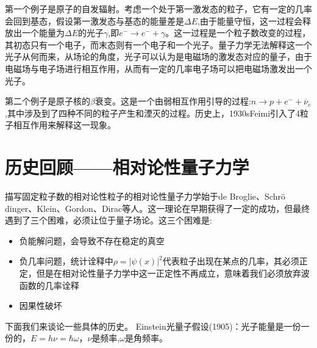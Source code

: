 第一个例子是原子的自发辐射。考虑一个处于第一激发态的粒子，它有一定的几率会回到基态，假设第一激发态与基态的能量差是$\Delta E$,由于能量守恒，这一过程会释放出一个能量为$\Delta E$的光子$\gamma$,即$e^{-} \longrightarrow e^{-}+\gamma$。这一过程是一个粒子数改变的过程，其初态只有一个电子，而末态则有一个电子和一个光子。量子力学无法解释这一个光子从何而来，从场论的角度，光子可以认为是电磁场的激发态对应的量子，由于电磁场与电子场进行相互作用，从而有一定的几率电子场可以把电磁场激发出一个光子。

第二个例子是原子核的$\beta$衰变。这是一个由弱相互作用引导的过程:$n \longrightarrow p+e^{-}+\overline{\nu}_{e}$,其中涉及到了四种不同的粒子产生和湮灭的过程。历史上，1930sFeimi引入了4粒子相互作用来解释这一现象。
\section{历史回顾——相对论性量子力学}
描写固定粒子数的相对论性粒子的相对论性量子力学始于de Broglie、Schr$\ddot{\rm{o}}$dinger、Klein、Gordon、Dirac等人。这一理论在早期获得了一定的成功，但最终遇到了三个困难，必须让位于量子场论。这三个困难是:
\begin{itemize}
    \item 负能解问题，会导致不存在稳定的真空
    \item 负几率问题，统计诠释中$\rho=|\psi(x)|^{2}$代表粒子出现在某点的几率，其必须正定，但是在相对论性量子力学中这一正定性不再成立，意味着我们必须放弃波函数的几率诠释
    \item 因果性破坏
\end{itemize}

下面我们来谈论一些具体的历史。
Einstein光量子假设(1905)：光子能量是一份一份的，$E=h\nu=\hbar \omega$，$\nu$是频率,$\omega$是角频率。

